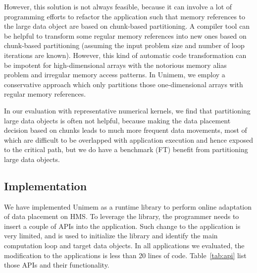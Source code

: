 However, this solution is not always feasible, because it can involve a lot of programming efforts to refactor the application such that memory references to the large data object are based on chunk-based partitioning.
A compiler tool can be helpful to transform some regular memory references into new ones based on chunk-based partitioning (assuming the input problem size and number of loop iterations are known). However, this kind of automatic code transformation can be impotent for high-dimensional arrays with the notorious memory alias problem and irregular memory access patterns. In Unimem, we employ a conservative approach which only partitions those one-dimensional arrays with regular memory references. %

In our evaluation with representative numerical kernels, we find that partitioning large data objects is often not helpful, %
because making the data placement decision based on chunks leads to much more frequent data movements,
most of which are difficult to be overlapped with application execution and hence exposed to the critical path, but we do have a benchmark (FT) benefit from partitioning large data objects.


\begin{comment}
\textbf{Phase combination.}
Some phase can be small in terms of execution time.
For such phase, the phase profiling and performance modeling alone can take most of the phase execution time.
This kind of phase is commonly spotted in communication intensive applications. To amortize the phase profiling and performance modeling cost, we do not consider such small phases.
Instead, those phases are combined with neighbor phases to build a larger phase. We make phase combination when the phase profiling and performance modeling of a phase take more than 20\% of the phase execution time.
\end{comment}

\subsection{Implementation}
\label{sec:impl}
We have implemented Unimem as a runtime library to perform online adaptation of data placement on HMS. To leverage the library, the programmer needs to insert a couple of APIs into the application.
Such change to the application is very limited, and is used to initialize the library and identify the main computation loop and target data objects.
In all applications we evaluated, the modification to the applications is less than 20 lines of code.
Table~\ref{tab:api} list those APIs and their functionality.


